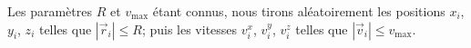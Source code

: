 			Les paramètres $R$ et $v_\mathrm{max}$ étant connus, nous tirons aléatoirement les positions
			$x_i$, $y_i$, $z_i$ telles que $|\vec{r}_i| \leq R$; puis les vitesses $v^x_i$, $v^y_i$, $v^z_i$
			telles que $|\vec{v}_i|\leq v_\mathrm{max}$.




